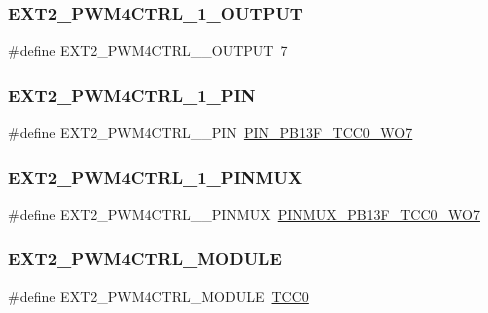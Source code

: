 \subsubsection{\texorpdfstring{EXT2\_PWM4CTRL\_1\_OUTPUT}{EXT2\_PWM4CTRL\_1\_OUTPUT}}
{\footnotesize\ttfamily \#define E\+X\+T2\+\_\+\+P\+W\+M4\+C\+T\+R\+L\+\_\+\_\+\+O\+U\+T\+P\+UT~7}

\mbox{\label{group__samd21__xplained__pro__features__group_ga100a3f3a09262300043d64c72499b879}} 
\subsubsection{\texorpdfstring{EXT2\_PWM4CTRL\_1\_PIN}{EXT2\_PWM4CTRL\_1\_PIN}}
{\footnotesize\ttfamily \#define E\+X\+T2\+\_\+\+P\+W\+M4\+C\+T\+R\+L\+\_\+\_\+\+P\+IN~\mbox{\hyperlink{pio_2samd21j18a_8h_a786bed2bb9fb5cfc59af6f22b448d972}{P\+I\+N\+\_\+\+P\+B13\+F\+\_\+\+T\+C\+C0\+\_\+\+W\+O7}}}

\mbox{\label{group__samd21__xplained__pro__features__group_gaead22ff2ab9100a11f5265ffa1cacfe2}} 
\subsubsection{\texorpdfstring{EXT2\_PWM4CTRL\_1\_PINMUX}{EXT2\_PWM4CTRL\_1\_PINMUX}}
{\footnotesize\ttfamily \#define E\+X\+T2\+\_\+\+P\+W\+M4\+C\+T\+R\+L\+\_\+\_\+\+P\+I\+N\+M\+UX~\mbox{\hyperlink{pio_2samd21j18a_8h_ad35539fcb76623253dfaf3f9247e4351}{P\+I\+N\+M\+U\+X\+\_\+\+P\+B13\+F\+\_\+\+T\+C\+C0\+\_\+\+W\+O7}}}

\mbox{\label{group__samd21__xplained__pro__features__group_ga046aa01afeacdafcf9917b71c316e0ba}} 
\subsubsection{\texorpdfstring{EXT2\_PWM4CTRL\_MODULE}{EXT2\_PWM4CTRL\_MODULE}}
{\footnotesize\ttfamily \#define E\+X\+T2\+\_\+\+P\+W\+M4\+C\+T\+R\+L\+\_\+\+M\+O\+D\+U\+LE~\mbox{\hyperlink{group___s_a_m_d21_j18_a__base_ga99138b66570ac6a4b370ce5c3b52cd9f}{T\+C\+C0}}}

